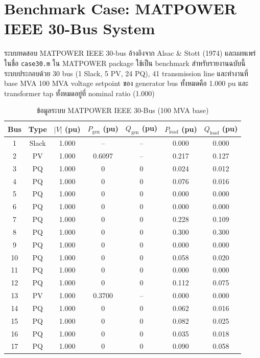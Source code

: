 \documentclass[12pt,a4paper]{article}
\begin{document}
\section{Benchmark Case: MATPOWER IEEE 30-Bus System}

ระบบทดสอบ MATPOWER IEEE 30-bus อ้างอิงจาก Alsac \& Stott (1974) และเผยแพร่ในชื่อ \texttt{case30.m} ใน MATPOWER package ใช้เป็น benchmark สำหรับรายงานฉบับนี้ ระบบประกอบด้วย 30 bus (1 Slack, 5 PV, 24 PQ), 41 transmission line และทำงานที่ base MVA 100 MVA voltage setpoint ของ generator bus ทั้งหมดคือ 1.000 pu และ transformer tap ทั้งหมดอยู่ที่ nominal ratio (1.000)

\begin{table}[H]
\centering
\caption{ข้อมูลระบบ MATPOWER IEEE 30-Bus (100 MVA base)}
\footnotesize
\begin{tabular}{ccccccc}
\toprule
\textbf{Bus} & \textbf{Type} & \textbf{$|V|$ (pu)} & \textbf{$P_{\text{gen}}$ (pu)} & \textbf{$Q_{\text{gen}}$ (pu)} & \textbf{$P_{\text{load}}$ (pu)} & \textbf{$Q_{\text{load}}$ (pu)} \\
\midrule
1  & Slack & 1.000 & -- & -- & 0.000 & 0.000 \\
2  & PV    & 1.000 & 0.6097 & -- & 0.217 & 0.127 \\
3  & PQ    & 1.000 & 0     & 0   & 0.024 & 0.012 \\
4  & PQ    & 1.000 & 0     & 0   & 0.076 & 0.016 \\
5  & PQ    & 1.000 & 0     & 0   & 0.000 & 0.000 \\
6  & PQ    & 1.000 & 0     & 0   & 0.000 & 0.000 \\
7  & PQ    & 1.000 & 0     & 0   & 0.228 & 0.109 \\
8  & PQ    & 1.000 & 0     & 0   & 0.300 & 0.300 \\
9  & PQ    & 1.000 & 0     & 0   & 0.000 & 0.000 \\
10 & PQ    & 1.000 & 0     & 0   & 0.058 & 0.020 \\
11 & PQ    & 1.000 & 0     & 0   & 0.000 & 0.000 \\
12 & PQ    & 1.000 & 0     & 0   & 0.112 & 0.075 \\
13 & PV    & 1.000 & 0.3700 & -- & 0.000 & 0.000 \\
14 & PQ    & 1.000 & 0     & 0   & 0.062 & 0.016 \\
15 & PQ    & 1.000 & 0     & 0   & 0.082 & 0.025 \\
16 & PQ    & 1.000 & 0     & 0   & 0.035 & 0.018 \\
17 & PQ    & 1.000 & 0     & 0   & 0.090 & 0.058 \\

\end{tabular}
\end{table}
\end{document}
